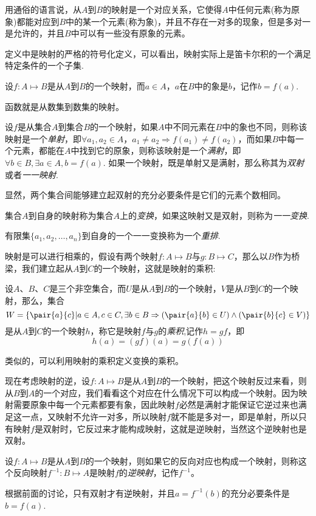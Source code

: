 用通俗的语言说，从$A$到$B$的映射是一个对应关系，它使得$A$中任何元素(称为原象)都能对应到$B$中的某一个元素(称为象)，并且不存在一对多的现象，但是多对一是允许的，并且$B$中可以有一些没有原象的元素。

定义中是映射的严格的符号化定义，可以看出，映射实际上是笛卡尔积的一个满足特定条件的一个子集.

设$f: A \mapsto B$是从$A$到$B$的一个映射，而$a \in A$，$a$在$B$中的象是$b$，记作$b=f(a)$.

函数就是从数集到数集的映射。

\begin{definition}
  设$f$是从集合$A$到集合$B$的一个映射，如果$A$中不同元素在$B$中的象也不同，则称该映射是一个\emph{单射}，即$\forall a_1,a_2 \in A，a_1 \neq a_2 \Rightarrow f(a_1) \neq f(a_2)$，而如果$B$中每一个元素，都能在$A$中找到它的原象，则称该映射是一个\emph{满射}，即$\forall b \in B, \exists a \in A, b=f(a)$. 如果一个映射，既是单射又是满射，那么称其为\emph{双射}或者\emph{一一映射}.
\end{definition}

显然，两个集合间能够建立起双射的充分必要条件是它们的元素个数相同。

\begin{definition}
  集合$A$到自身的映射称为集合$A$上的\emph{变换}，如果这映射又是双射，则称为\emph{一一变换}.
\end{definition}

有限集$\{a_1,a_2,\ldots,a_n\}$到自身的一个一一变换称为一个\emph{重排}.

映射是可以进行相乘的，假设有两个映射$f: A \mapsto B$与$g: B \mapsto C$，那么以$B$作为桥梁，我们建立起从$A$到$C$的一个映射，这就是映射的乘积:

\begin{definition}
  设$A$、$B$、$C$是三个非空集合，而$U$是从$A$到$B$的一个映射，$V$是从$B$到$C$的一个映射，那么，集合
  \[ W = \{ \pair{a}{c} | a \in A, c \in C, \exists b \in B \Rightarrow (\pair{a}{b} \in U) \land (\pair{b}{c} \in V) \} \]
  是从$A$到$C$的一个映射$h$，称它是映射$f$与$g$的\emph{乘积},记作$h=gf$，即
  \[ h(a) = (gf)(a) = g(f(a)) \]
\end{definition}

类似的，可以利用映射的乘积定义变换的乘积。

现在考虑映射的逆，设$f: A \mapsto B$是从$A$到$B$的一个映射，把这个映射反过来看，则从$B$到$A$的一个对应，我们看看这个对应在什么情况下可以构成一个映射。因为映射需要原象中每一个元素都要有象，因此映射$f$必然是满射才能保证它逆过来也满足这一点，又映射不允许一对多，所以映射$f$就不能是多对一，即是单射，所以只有映射$f$是双射时，它反过来才能构成映射，这就是逆映射，当然这个逆映射也是双射。
\begin{definition}
  设$f: A \mapsto B$是从$A$到$B$的一个映射，则如果它的反向对应也构成一个映射，则称这个反向映射$f^{-1}: B \mapsto A$是映射$f$的\emph{逆映射}，记作$f^{-1}$。
\end{definition}
根据前面的讨论，只有双射才有逆映射，并且$a=f^{-1}(b)$的充分必要条件是$b=f(a)$.

